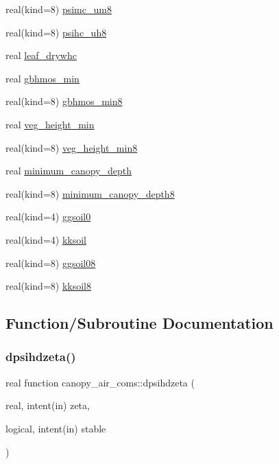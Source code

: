 \begin{DoxyCompactItemize}
\item 
real(kind=8) \hyperlink{namespacecanopy__air__coms_a0c0c8fcefe0b43284cb9e1f33438460e}{psimc\+\_\+um8}
\item 
real(kind=8) \hyperlink{namespacecanopy__air__coms_a31831f12ac9b9a0c6c50fd454999572d}{psihc\+\_\+uh8}
\item 
real \hyperlink{namespacecanopy__air__coms_a325451bf2fb18b7f7ede855957b8a525}{leaf\+\_\+drywhc}
\item 
real \hyperlink{namespacecanopy__air__coms_abe79d14b93c9428f34d88610142bc148}{gbhmos\+\_\+min}
\item 
real(kind=8) \hyperlink{namespacecanopy__air__coms_af56b6b535e7f020cae8112c71a4f8a87}{gbhmos\+\_\+min8}
\item 
real \hyperlink{namespacecanopy__air__coms_ac23c06de9e56ff0ec7fe2ad917739b94}{veg\+\_\+height\+\_\+min}
\item 
real(kind=8) \hyperlink{namespacecanopy__air__coms_a95554424abccff80dcf9ccc3a20b89bf}{veg\+\_\+height\+\_\+min8}
\item 
real \hyperlink{namespacecanopy__air__coms_a99c058d51064878e734347335a373bf0}{minimum\+\_\+canopy\+\_\+depth}
\item 
real(kind=8) \hyperlink{namespacecanopy__air__coms_ad5c4f0e54114b54fefc1ad1b9908459a}{minimum\+\_\+canopy\+\_\+depth8}
\item 
real(kind=4) \hyperlink{namespacecanopy__air__coms_ac69a764f05bd0350e81b9b0dc1906fe6}{ggsoil0}
\item 
real(kind=4) \hyperlink{namespacecanopy__air__coms_aafc2da976dc3ee14efea2a73b6218d88}{kksoil}
\item 
real(kind=8) \hyperlink{namespacecanopy__air__coms_ace11cb0bb5a5d94330e33907db547ab1}{ggsoil08}
\item 
real(kind=8) \hyperlink{namespacecanopy__air__coms_a05ce085ac25979fd0664f46be52b547d}{kksoil8}
\end{DoxyCompactItemize}


\subsection{Function/\+Subroutine Documentation}
\mbox{\label{namespacecanopy__air__coms_a64552e0380fcb36366b5eb0f624241a3}} 
\subsubsection{\texorpdfstring{dpsihdzeta()}{dpsihdzeta()}}
{\footnotesize\ttfamily real function canopy\+\_\+air\+\_\+coms\+::dpsihdzeta (\begin{DoxyParamCaption}\item[{real, intent(in)}]{zeta,  }\item[{logical, intent(in)}]{stable }\end{DoxyParamCaption})}

